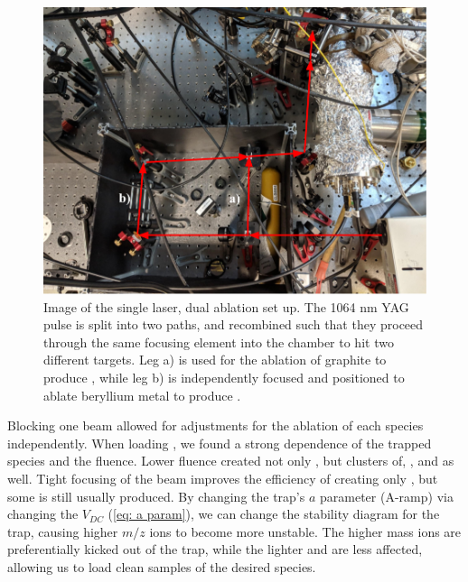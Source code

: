 \begin{figure}[H]
	\centering
	\includegraphics[width=\textwidth]{images/ablation_optics.png}
	\caption{Image of the single laser, dual ablation set up. The 1064 nm YAG pulse is split into two paths, and recombined such that they proceed through the same focusing element into the chamber to hit two different targets. Leg a) is used for the ablation of graphite to produce , while leg b) is independently focused and positioned to ablate beryllium metal to produce .}
	\label{fig: dual ablation}
\end{figure}

Blocking one beam allowed for adjustments for the ablation of each species independently. When loading , we found a strong dependence of the trapped species and the fluence. Lower fluence created not only , but clusters of, , and  as well. Tight focusing of the beam improves the efficiency of creating only , but some  is still usually produced. By changing the trap's $a$ parameter (A-ramp) via changing the $V_{DC}$ (\ref{eq: a param}), we can change the stability diagram for the trap, causing higher $m/z$ ions to become more unstable. The higher mass  ions are preferentially kicked out of the trap, while the lighter  and  are less affected, allowing us to load clean samples of the desired species.

